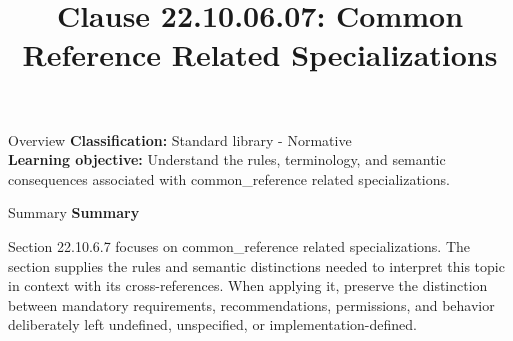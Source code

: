 \documentclass[10pt,letterpaper]{article}
\title{Clause 22.10.06.07: Common Reference Related Specializations}
\author{}
\date{}
\begin{document}
\maketitle
\begin{CornellOverviewBox}{Overview}
\textbf{Classification:} Standard library - Normative\\[2pt]
\textbf{Learning objective:} Understand the rules, terminology, and semantic consequences associated with common\_reference related specializations.
\end{CornellOverviewBox}\begin{CornellSummaryBox}{Summary}
{\sffamily\bfseries\color{Accent} Summary}\par\vspace{3pt}Section 22.10.6.7 focuses on common\_reference related specializations. The section supplies the rules and semantic distinctions needed to interpret this topic in context with its cross-references. When applying it, preserve the distinction between mandatory requirements, recommendations, permissions, and behavior deliberately left undefined, unspecified, or implementation-defined.
\end{CornellSummaryBox}
\end{document}
